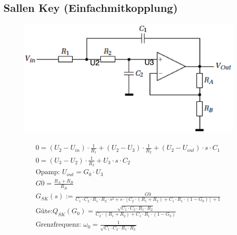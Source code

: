 \subsection{Sallen Key (Einfachmitkopplung)}
\begin{figure}[htb]
\centering
 \includegraphics[scale=0.5]{pictures/sallenkey}
\end{figure}
\begin{gather}
0=(U_2-U_{in})\cdot \frac{1}{R_1}+(U_2-U_3)\cdot \frac{1}{R_2}+(U_2-U_{out})\cdot s\cdot C_1\\
0=(U_3-U_2)\cdot \frac{1}{R_2}+U_3\cdot s\cdot C_2\\
\text{Opamp: }U_{out}=G_0\cdot U_3\\
G0=\frac{R_{A}+R_{B}}{R_{B}}\\
G_{SK}(s):=\frac{G0}{C_1\cdot C_2\cdot R_1\cdot R_2\cdot s^2+s\cdot [C_2\cdot
(R_1+R_2)+C_1\cdot R_1\cdot (1-G_0)]+1}\\
\text{Güte:
}Q_{SK}(G_0)=\frac{\sqrt{C_1\cdot C_2\cdot R_1\cdot R_2}}{C_2\cdot (R_1+R_2)+C_1\cdot R_1\cdot (1-G_0)}\\
\text{Grenzfrequenz: }\omega_0=\frac{1}{\sqrt{C_1\cdot C_2\cdot R_1\cdot R_2}}
\end{gather}
